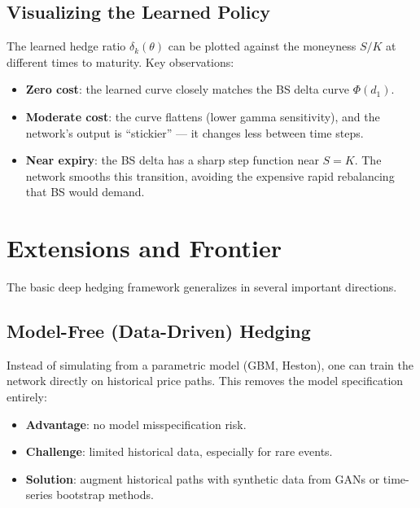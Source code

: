 \documentclass[11pt, a4paper]{article}
\theoremstyle{definition}
\theoremstyle{plain}
\theoremstyle{remark}
\begin{document}
\subsection{Visualizing the Learned Policy}

The learned hedge ratio $\delta_k(\theta)$ can be plotted against the moneyness $S/K$
at different times to maturity.
Key observations:
\begin{itemize}
    \item \textbf{Zero cost}: the learned curve closely matches the BS delta curve $\Phi(d_1)$.
    \item \textbf{Moderate cost}: the curve flattens (lower gamma sensitivity),
          and the network's output is ``stickier'' --- it changes less between time steps.
    \item \textbf{Near expiry}: the BS delta has a sharp step function near $S = K$.
          The network smooths this transition, avoiding the expensive rapid rebalancing
          that BS would demand.
\end{itemize}

\section{Extensions and Frontier}
\label{sec:extensions}

The basic deep hedging framework generalizes in several important directions.

\subsection{Model-Free (Data-Driven) Hedging}

Instead of simulating from a parametric model (GBM, Heston),
one can train the network directly on historical price paths.
This removes the model specification entirely:
\begin{itemize}
    \item \textbf{Advantage}: no model misspecification risk.
    \item \textbf{Challenge}: limited historical data, especially for rare events.
    \item \textbf{Solution}: augment historical paths with synthetic data from GANs
          or time-series bootstrap methods.
\end{itemize}
\end{document}
